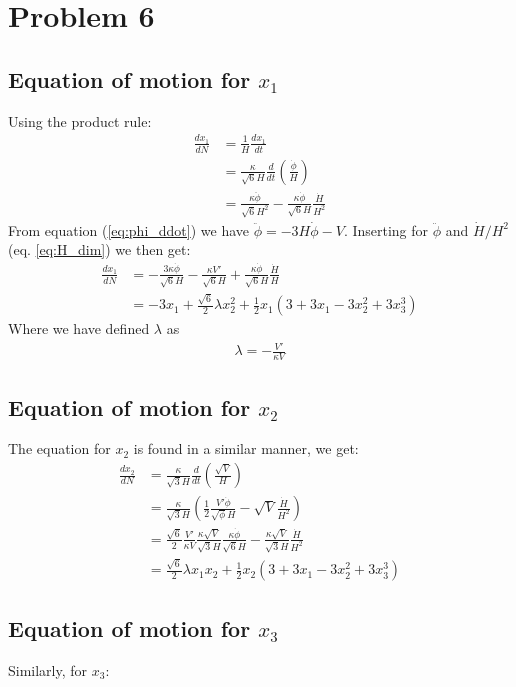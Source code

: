 \documentclass[reprint,english,notitlepage]{revtex4-1}  %
\begin{document}
\section{Problem 6}
\subsection{Equation of motion for $x_1$}
Using the product rule:
\begin{align}
	\frac{dx_1}{dN} &= \frac{1}{H}\frac{dx_1}{dt} \\
	&= \frac{\kappa}{\sqrt{6}H}\frac{d}{dt}\left(\frac{\dot{\phi}}{H}\right)\\
	&= \frac{\kappa\ddot{\phi}}{\sqrt{6}H^2} - \frac{\kappa\dot{\phi}}{\sqrt{6}H}\frac{\dot{H}}{H^2}
\end{align}
From equation (\ref{eq:phi_ddot}) we have $\ddot{\phi}=-3H\dot{\phi}-{V}$.
Inserting for $\ddot{\phi}$ and $\dot{H}/H^2$ (eq. \ref{eq:H_dim}) we then get:
\begin{align}
	\frac{dx_1}{dN} &= -\frac{3\kappa\dot{\phi}}{\sqrt{6}H} - \frac{\kappa V'}{\sqrt{6}H}
										+ \frac{\kappa\dot{\phi}}{\sqrt{6}H}\frac{\dot{H}}{H} \\
									&= -3x_1	 + \frac{\sqrt{6}}{2}\lambda x_2^2
										+ \frac{1}{2}x_1(3+3x_1 - 3x_2^2 + 3x_3^3)
\end{align}
Where we have defined $\lambda$ as
\begin{align}
	\lambda = -\frac{V'}{\kappa V}
\end{align}

\subsection{Equation of motion for $x_2$}
The equation for $x_2$ is found in a similar manner, we get:
\begin{align}
	\frac{dx_2}{dN} &= \frac{\kappa}{\sqrt{3}H}\frac{d}{dt}\left(\frac{\sqrt{V}}{H}\right)\\
									&= \frac{\kappa}{\sqrt{3}H}\left(\frac{1}{2}\frac{V'\dot{\phi}}
									{\sqrt{\phi}H}-\sqrt{V}\frac{\dot{H}}{H^2}\right) \\
									&=\frac{\sqrt{6}}{2}\frac{V'}{\kappa V}\frac{\kappa \sqrt{V}}{\sqrt{3}H}
										\frac{\kappa\dot{\phi}}{\sqrt{6}H} - \frac{\kappa\sqrt{V}}{\sqrt{3}H}
										\frac{\dot{H}}{H^2} \\
									&=\frac{\sqrt{6}}{2}\lambda x_1 x_2 + \frac{1}{2}x_2
									(3+3x_1 - 3x_2^2 + 3x_3^3)
\end{align}
\subsection{Equation of motion for $x_3$}
Similarly, for $x_3$:
\end{document}
